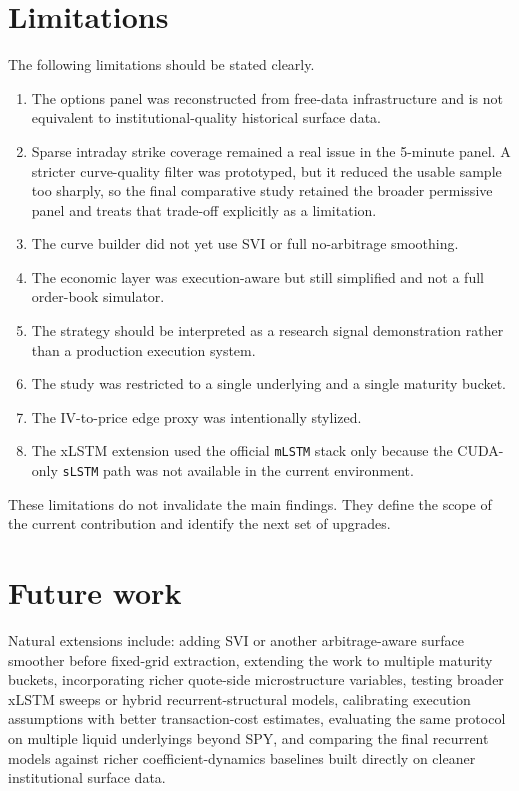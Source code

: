 \documentclass[12pt]{report}
\begin{document}
\section{Limitations}
The following limitations should be stated clearly.
\begin{enumerate}[leftmargin=1.2cm]
    \item The options panel was reconstructed from free-data infrastructure and is not equivalent to institutional-quality historical surface data.
    \item Sparse intraday strike coverage remained a real issue in the 5-minute panel. A stricter curve-quality filter was prototyped, but it reduced the usable sample too sharply, so the final comparative study retained the broader permissive panel and treats that trade-off explicitly as a limitation.
    \item The curve builder did not yet use SVI or full no-arbitrage smoothing.
    \item The economic layer was execution-aware but still simplified and not a full order-book simulator.
    \item The strategy should be interpreted as a research signal demonstration rather than a production execution system.
    \item The study was restricted to a single underlying and a single maturity bucket.
    \item The IV-to-price edge proxy was intentionally stylized.
    \item The xLSTM extension used the official \texttt{mLSTM} stack only because the CUDA-only \texttt{sLSTM} path was not available in the current environment.
\end{enumerate}

These limitations do not invalidate the main findings. They define the scope of the current contribution and identify the next set of upgrades.

\section{Future work}
Natural extensions include: adding SVI or another arbitrage-aware surface smoother before fixed-grid extraction, extending the work to multiple maturity buckets, incorporating richer quote-side microstructure variables, testing broader xLSTM sweeps or hybrid recurrent-structural models, calibrating execution assumptions with better transaction-cost estimates, evaluating the same protocol on multiple liquid underlyings beyond SPY, and comparing the final recurrent models against richer coefficient-dynamics baselines built directly on cleaner institutional surface data.
\end{document}
